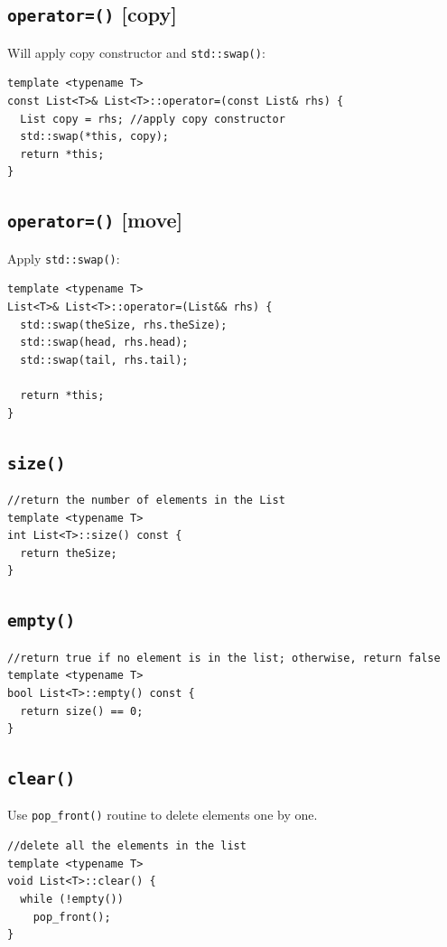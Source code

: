 \documentclass[12pt]{book}
\begin{document}
\subsection{\texttt{operator=()} [copy]}
\label{sec:orgd094e5b}
Will apply copy constructor and \texttt{std::swap()}:
\begin{verbatim}
template <typename T>
const List<T>& List<T>::operator=(const List& rhs) {
  List copy = rhs; //apply copy constructor
  std::swap(*this, copy);
  return *this;
}
\end{verbatim}
\subsection{\texttt{operator=()} [move]}
\label{sec:org605efcc}
Apply \texttt{std::swap()}:
\begin{verbatim}
template <typename T>
List<T>& List<T>::operator=(List&& rhs) {
  std::swap(theSize, rhs.theSize);
  std::swap(head, rhs.head);
  std::swap(tail, rhs.tail);

  return *this;
}
\end{verbatim}
\subsection{\texttt{size()}}
\label{sec:org91ba56e}
\begin{verbatim}
//return the number of elements in the List
template <typename T>
int List<T>::size() const {
  return theSize;
}
\end{verbatim}
\subsection{\texttt{empty()}}
\label{sec:org0a3a4c2}
\begin{verbatim}
//return true if no element is in the list; otherwise, return false
template <typename T>
bool List<T>::empty() const {
  return size() == 0;
}
\end{verbatim}
\subsection{\texttt{clear()}}
\label{sec:org0224fb4}
Use \texttt{pop\_front()} routine to delete elements one by one.
\begin{verbatim}
//delete all the elements in the list
template <typename T>
void List<T>::clear() {
  while (!empty())
    pop_front();
}
\end{verbatim}
\end{document}
